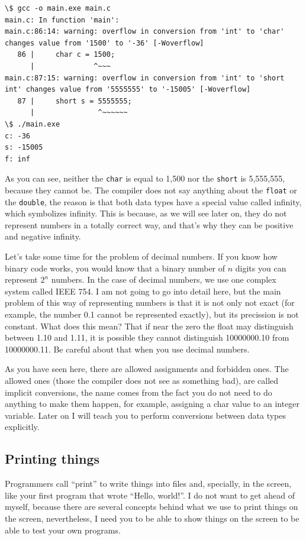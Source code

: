 \documentclass[a4paper]{article}
\begin{document}
\noindent
\begin{minipage}[H]{\linewidth}
\mbox{}
\begin{lstlisting}[style=terminalStyle]
\$ gcc -o main.exe main.c
main.c: In function 'main':
main.c:86:14: warning: overflow in conversion from 'int' to 'char' changes value from '1500' to '-36' [-Woverflow]
   86 |     char c = 1500;
      |              ^~~~
main.c:87:15: warning: overflow in conversion from 'int' to 'short int' changes value from '5555555' to '-15005' [-Woverflow]
   87 |     short s = 5555555;
      |               ^~~~~~~
\$ ./main.exe
c: -36
s: -15005
f: inf
\end{lstlisting}
\end{minipage}

As you can see, neither the \texttt{char} is equal to 1,500 nor the
\texttt{short} is 5,555,555, because they cannot be. The compiler does not say
anything about the \texttt{float} or the \texttt{double}, the reason is that
both data types have a special value called infinity, which symbolizes infinity.
This is because, as we will see later on, they do not represent numbers in a
totally correct way, and that's why they can be positive and negative infinity.

Let's take some time for the problem of decimal numbers. If you know how binary
code works, you would know that a binary number of $n$ digits you can represent
$2^n$ numbers. In the case of decimal numbers, we use one complex system called
IEEE 754. I am not going to go into detail here, but the main problem of this
way of representing numbers is that it is not only not exact (for example,
the number 0.1 cannot be represented exactly), but its precission is not
constant. What does this mean? That if near the zero the float may distinguish
between 1.10 and 1.11, it is possible they cannot distinguish 10000000.10 from
10000000.11. Be careful about that when you use decimal numbers.

As you have seen here, there are allowed assignments and forbidden ones. The
allowed ones (those the compiler does not see as something bad), are called
implicit conversions, the name comes from the fact you do not need to do
anything to make them happen, for example, assigning a char value to an integer
variable. Later on I will teach you to perform conversions between data types
explicitly.

\subsection{Printing things}
Programmers call ``print'' to write things into files and, specially, in the
screen, like your first program that wrote ``Hello, world!''. I do not want to
get ahead of myself, because there are several concepts behind what we use to
print things on the screen, nevertheless, I need you to be able to show things
on the screen to be able to test your own programs.
\end{document}

